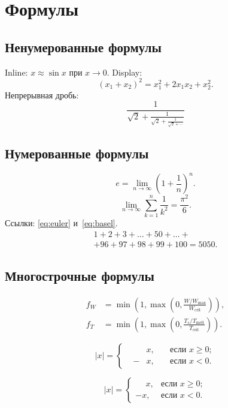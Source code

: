 \documentclass[font=modern]{cmcmsuthesis-phd}
\begin{document}
\chapter{Формулы}\label{ch:formulas}

\section{Ненумерованные формулы}
Inline: $x\approx\sin x$ при $x\to 0$.
Display: \[(x_1+x_2)^2=x_1^2+2x_1x_2+x_2^2.\]
Непрерывная дробь:
\[\frac{1}{\sqrt{2}+\displaystyle\frac{1}{\sqrt{2}+\displaystyle\frac{1}{\sqrt{2}+\cdots}}}\]

\section{Нумерованные формулы}
\begin{equation}\label{eq:euler}e=\lim_{n\to\infty}\left(1+\frac{1}{n}\right)^{\!n}.\end{equation}
\begin{equation}\label{eq:basel}\lim_{n\to\infty}\sum_{k=1}^n\frac{1}{k^2}=\frac{\pi^2}{6}.\end{equation}
Ссылки: \eqref{eq:euler} и~\eqref{eq:basel}.
\begin{equation}\label{eq:long}\begin{multlined}1+2+3+\dots+50+\dots+\\+96+97+98+99+100=5050.\end{multlined}\end{equation}

\section{Многострочные формулы}
\[\begin{aligned}f_W&=\min\!\left(1,\max\!\left(0,\frac{W/W_{\max}}{W_{\text{crit}}}\right)\right),\\f_T&=\min\!\left(1,\max\!\left(0,\frac{T_s/T_{\text{melt}}}{T_{\text{crit}}}\right)\right).\end{aligned}\]

\[|x|=\left\{\begin{alignedat}{2}& &x,\quad&\text{если }x\geqslant 0;\\&-&x,\quad&\text{если }x<0.\end{alignedat}\right.\]

\[|x|=\begin{cases}\phantom{-}x,&\text{если }x\geqslant 0;\\-x,&\text{если }x<0.\end{cases}\]
\end{document}
